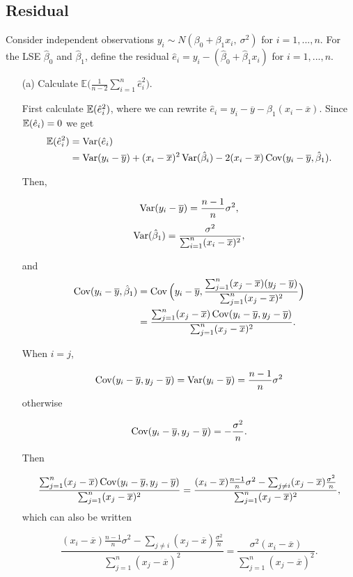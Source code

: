 \documentclass{tufte-book}
\begin{document}
\subsection{Residual} Consider independent observations $y_i \sim N(\beta_0+\beta_1x_i,\ \sigma^2)$ for $i=1,...,n$.  For the LSE $\hat{\beta}_0$ and $\hat{\beta}_1$, define the residual $\hat{e}_i = y_i - (\hat{\beta}_0+\hat{\beta}_1x_i)$ for $i=1,...,n$.
\begin{enumerate}
\item[(a)] Calculate $\mathbb{E}\big(\frac{1}{n-2} \sum_{i=1}^n \hat{e}_i^2\big)$.

First calculate $\operatorname{\mathbb{E}}(\hat{e}_i^2)$, where we can rewrite $\hat{e}_i=y_i-\overline{y}-\hat{\beta}_1(x_i-\overline{x})$.  Since $\operatorname{\mathbb{E}}(\hat{e}_i)=0$ we get
\begin{align*}
\operatorname{\mathbb{E}}(\hat{e}_i^2) &= \operatorname{Var}(\hat{e}_i) \\
&= \operatorname{Var}(y_i-\overline{y}) + (x_i-\overline{x})^2\operatorname{Var}(\hat{\beta}_i) - 2(x_i-\overline{x})\operatorname{Cov}(y_i-\overline{y}, \hat{\beta}_1).\\
\end{align*}

Then,

\[ \operatorname{Var}(y_i-\overline{y}) = \frac{n-1}{n}\sigma^2,\]
\[ \operatorname{Var}(\hat{\beta}_1) = \frac{\sigma^2}{\sum_{i=1}^n(x_i-\overline{x})^2}, \]

and
\begin{align*}
\operatorname{Cov}(y_i-\overline{y},\hat{\beta}_1) &= \operatorname{Cov}\Big(y_i-\overline{y}, \frac{\sum_{j=1}^n(x_j-\overline{x})(y_j-\overline{y})}{\sum_{j=1}^n(x_j-\overline{x})^2}  \Big)\\
&= \frac{\sum_{j=1}^n(x_j-\overline{x})\operatorname{Cov}(y_i-\overline{y}, y_j-\overline{y})}{\sum_{j=1}^n(x_j-\overline{x})^2}.\\
\end{align*}

When $i=j$,

\[ \operatorname{Cov}(y_i-\overline{y},y_j-\overline{y})=\operatorname{Var}(y_i-\overline{y}) = \frac{n-1}{n}\sigma^2 \]
otherwise

\[ \operatorname{Cov}(y_i-\overline{y},y_j-\overline{y})= -\frac{\sigma^2}{n}.\]

Then

\[ \frac{\sum_{j=1}^n(x_j-\overline{x})\operatorname{Cov}(y_i-\overline{y}, y_j-\overline{y})}{\sum_{j=1}^n(x_j-\overline{x})^2} = \frac{(x_i-\overline{x})\frac{n-1}{n}\sigma^2-\sum_{j\neq i}(x_j-\overline{x})\frac{\sigma^2}{n}}{\sum_{j=1}^n(x_j-\overline{x})^2}, \]
which can also be written

\[ \frac{(x_i-\overline{x})\frac{n-1}{n}\sigma^2-\sum_{j\neq i}(x_j-\overline{x})\frac{\sigma^2}{n}}{\sum_{j=1}^n(x_j-\overline{x})^2} = \frac{\sigma^2(x_i-\overline{x})}{\sum_{j=1}^n(x_j-\overline{x})^2}. \]


\end{enumerate}
\end{document}
